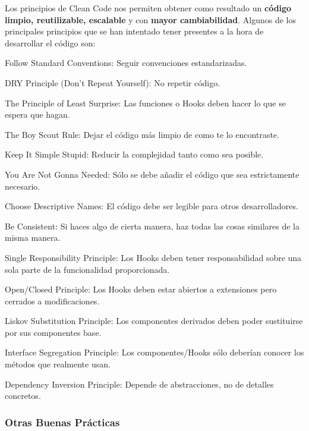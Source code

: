 \documentclass[12pt,twoside,titlepage]{report}
\begin{document}
Los principios de Clean Code nos permiten obtener como resultado un \textbf{código limpio, reutilizable, escalable} y con \textbf{mayor cambiabilidad}. Algunos de los principales principios que se han intentado tener presentes a la hora de desarrollar el código son:

\begin{compactitem}
    \item Follow Standard Conventions: Seguir convenciones estandarizadas.
    \item DRY Principle (Don't Repeat Yourself): No repetir código.
    \item The Principle of Least Surprise: Las funciones o Hooks deben hacer lo que se espera que hagan.
    \item The Boy Scout Rule: Dejar el código más limpio de como te lo encontraste.
    \item Keep It Simple Stupid: Reducir la complejidad tanto como sea posible.
    \item You Are Not Gonna Needed: Sólo se debe añadir el código que sea estrictamente necesario.
    \item Choose Descriptive Names: El código debe ser legible para otros desarrolladores.
    \item Be Consistent: Si haces algo de cierta manera, haz todas las cosas similares de la misma manera.
    \item Single Responsibility Principle: Los Hooks deben tener responsabilidad sobre una sola parte de la funcionalidad proporcionada.
    \item Open/Closed Principle: Los Hooks deben estar abiertos a extensiones pero cerrados a modificaciones.
    \item Liskov Substitution Principle: Los componentes derivados deben poder sustituirse por sus componentes base.
    \item Interface Segregation Principle: Los componentes/Hooks sólo deberían conocer los métodos que realmente usan.
    \item Dependency Inversion Principle: Depende de abstracciones, no de detalles concretos.
\end{compactitem}

\subsubsection{Otras Buenas Prácticas}
\end{document}
